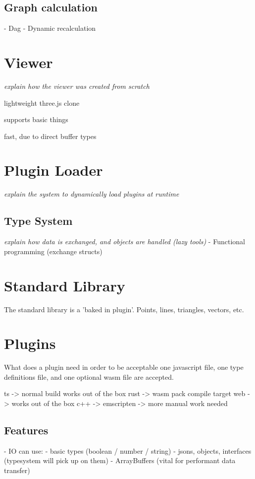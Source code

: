 \subsection*{Graph calculation}
  - Dag
  - Dynamic recalculation 

\section{Viewer}
\emph{explain how the viewer was created from scratch}

lightweight three.js clone

supports basic things

fast, due to direct buffer types

\section{ Plugin Loader } 

\emph{explain the system to dynamically load plugins at runtime}

\subsection{ Type System }

\emph{explain how data is exchanged, and objects are handled (lazy tools)}
- Functional programming (exchange structs)

\section{ Standard Library }

The standard library is a 'baked in plugin'.
Points, lines, triangles, vectors, etc.

\section{ Plugins }
What does a plugin need in order to be acceptable
one javascript file, one type definitions file, and one optional wasm file are accepted. 

ts -> normal build works out of the box
rust -> wasm pack compile target web -> works out of the box 
c++ -> emscripten -> more manual work needed 

\subsection{Features}
- IO can use:
  - basic types (boolean / number / string)
  - jsons, objects, interfaces (typesystem will pick up on them)
  - ArrayBuffers (vital for performant data transfer)




